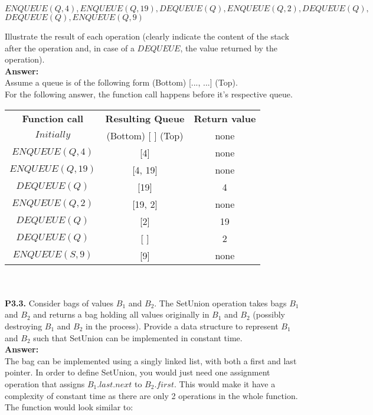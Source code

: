 \documentclass{article}
\begin{document}
\begin{center}
    $ENQUEUE(Q,4), ENQUEUE(Q,19), DEQUEUE(Q), ENQUEUE(Q,2), DEQUEUE(Q), $
    $DEQUEUE(Q), ENQUEUE(Q,9)$
\end{center}

\noindent
Illustrate the result of each operation (clearly indicate the content of the stack after the operation and, in case of a $DEQUEUE$, the value returned by the operation).\\

\noindent \textbf{Answer: }\\
Assume a queue is of the following form (Bottom) [..., ...] (Top).\\
For the following answer, the function call happens before it's respective queue.\\
\noindent

\bgroup
\def\arraystretch{1.2}
\begin{tabular}{ c c c }
    \textbf{Function call} & \textbf{Resulting Queue} & \textbf{Return value}\\
    $Initially$ & (Bottom) [ ] (Top) & none\\
    $ENQUEUE(Q,4)$ & [4] & none\\
    $ENQUEUE(Q,19)$ & [4, 19] & none\\
    $DEQUEUE(Q)$ & [19] & 4\\
    $ENQUEUE(Q,2)$ & [19, 2] & none\\
    $DEQUEUE(Q)$ & [2] & 19\\
    $DEQUEUE(Q)$ & [ ] & 2\\
    $ENQUEUE(S,9)$ & [9] & none\\
\end{tabular}
\egroup\\\\

\noindent
\textbf{P3.3.} Consider bags of values $B_1$ and $B_2$. The SetUnion operation takes bags $B_1$ and $B_2$ and returns a bag
holding all values originally in $B_1$ and $B_2$ (possibly destroying $B_1$ and $B_2$ in the process). Provide a data structure to represent $B_1$ and $B_2$ such that SetUnion can be implemented in constant time.\\

\noindent \textbf{Answer: }\\
The bag can be implemented using a singly linked list, with both a first and last pointer.
In order to define SetUnion, you would just need one assignment operation that assigns $B_1.last.next$ to $B_2.first$. This would make it have a complexity of constant time as there are only 2 operations in the whole function. The function would look similar to:
\end{document}
